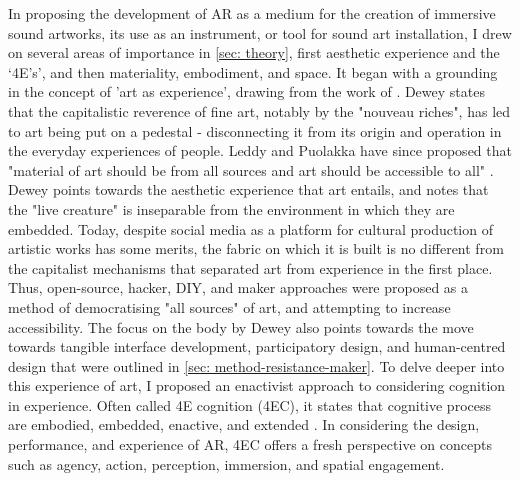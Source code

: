 In proposing the development of AR as a medium for the creation of immersive sound artworks, its use as an instrument, or tool for sound art installation, I drew on several areas of importance in \autoref{sec: theory}, first aesthetic experience and the `4E's', and then materiality, embodiment, and space. It began with a grounding in the concept of 'art as experience', drawing from the work of \citep{dewey1934}. Dewey states that the capitalistic reverence of fine art, notably by the "nouveau riches", has led to art being put on a pedestal - disconnecting it from its origin and operation in the everyday experiences of people. Leddy and Puolakka have since proposed that "material of art should be from all sources and art should be accessible to all" \citeyearpar{leddy2021}. Dewey points towards the aesthetic experience that art entails, and notes that the "live creature" is inseparable from the environment in which they are embedded. Today, despite social media as a platform for cultural production of artistic works has some merits, the fabric on which it is built is no different from the capitalist mechanisms that separated art from experience in the first place. Thus, open-source, hacker, DIY, and maker approaches were proposed as a method of democratising "all sources" of art, and attempting to increase accessibility. The focus on the body by Dewey also points towards the move towards tangible interface development, participatory design, and human-centred design that were outlined in \autoref{sec: method-resistance-maker}. To delve deeper into this experience of art, I proposed an enactivist approach to considering cognition in experience. Often called 4E cognition (4EC), it states that cognitive process are embodied, embedded, enactive, and extended \citep{gallagher2017}. In considering the design, performance, and experience of AR, 4EC offers a fresh perspective on concepts such as agency, action, perception, immersion, and spatial engagement.

